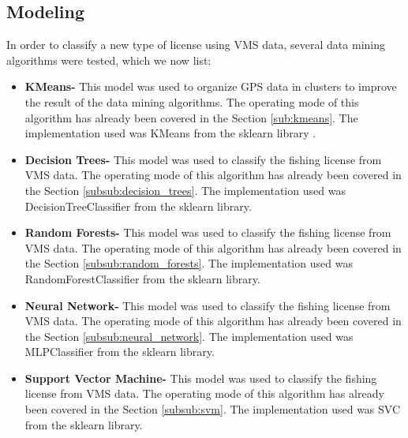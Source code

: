 \subsection{Modeling} %
\label{sub:modeling}
In order to classify a new type of license using VMS data, several data mining algorithms were tested, which we now list:
\begin{itemize}
\item \textbf{ KMeans-} This model was used to organize GPS data in clusters to improve the result of the data mining algorithms. The operating mode of this algorithm has already been covered in the Section \ref{sub:kmeans}.
The implementation used was KMeans from the sklearn library \cite{WEBSITE:scikit}.

\item \textbf{ Decision Trees- } This model was used to classify the fishing license from VMS data. The operating mode of this algorithm has already been covered in the Section \ref{subsub:decision_trees}. The implementation used was DecisionTreeClassifier from the sklearn library.


\item \textbf{ Random Forests- } This model was used to classify the fishing license from VMS data. The operating mode of this algorithm has already been covered in the Section \ref{subsub:random_forests}. The implementation used was RandomForestClassifier from the sklearn library.


\item \textbf{Neural Network- } This model was used to classify the fishing license from VMS data. The operating mode of this algorithm has already been covered in the Section \ref{subsub:neural_network}. The implementation used was MLPClassifier from the sklearn library.

\item \textbf{Support Vector Machine- } This model was used to classify the fishing license from VMS data. The operating mode of this algorithm has already been covered in the Section \ref {subsub:svm}. The implementation used was SVC from the sklearn library.
\end{itemize}



